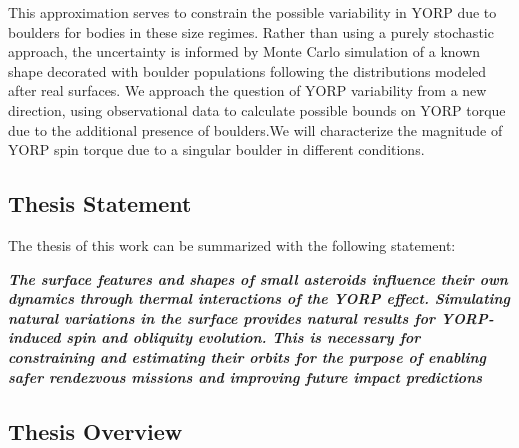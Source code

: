 This approximation serves to constrain the possible variability in YORP due to boulders for bodies in these size regimes. Rather than using a purely stochastic approach, the uncertainty is informed by Monte Carlo simulation of a known shape decorated with boulder populations following the distributions modeled after real surfaces. We approach the question of YORP variability from a new direction, using observational data to calculate possible bounds on YORP torque due to the additional presence of boulders.We will characterize the magnitude of YORP spin torque due to a singular boulder in different conditions.
\subsection{Thesis Statement}
The thesis of this work can be summarized with the following statement:

\centering
\textbf{\it{The surface features and shapes of small asteroids influence their own dynamics through thermal interactions of the YORP effect. Simulating natural variations in the surface provides natural results for YORP-induced spin and obliquity evolution. This is necessary for constraining and estimating their orbits for the purpose of enabling safer rendezvous missions and improving future impact predictions}}
\subsection{Thesis Overview}
